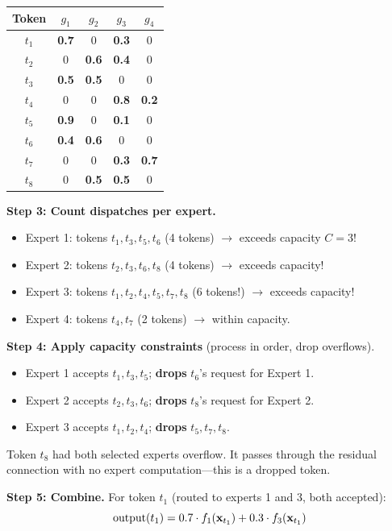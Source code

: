 \begin{center}
\begin{tabular}{c|cccc}
Token & $g_1$ & $g_2$ & $g_3$ & $g_4$ \\
\hline
$t_1$ & \textbf{0.7} & 0 & \textbf{0.3} & 0 \\
$t_2$ & 0 & \textbf{0.6} & \textbf{0.4} & 0 \\
$t_3$ & \textbf{0.5} & \textbf{0.5} & 0 & 0 \\
$t_4$ & 0 & 0 & \textbf{0.8} & \textbf{0.2} \\
$t_5$ & \textbf{0.9} & 0 & \textbf{0.1} & 0 \\
$t_6$ & \textbf{0.4} & \textbf{0.6} & 0 & 0 \\
$t_7$ & 0 & 0 & \textbf{0.3} & \textbf{0.7} \\
$t_8$ & 0 & \textbf{0.5} & \textbf{0.5} & 0 \\
\end{tabular}
\end{center}

\textbf{Step 3: Count dispatches per expert.}
\begin{itemize}
  \item Expert 1: tokens $t_1, t_3, t_5, t_6$ (4 tokens) $\to$ exceeds capacity $C=3$!
  \item Expert 2: tokens $t_2, t_3, t_6, t_8$ (4 tokens) $\to$ exceeds capacity!
  \item Expert 3: tokens $t_1, t_2, t_4, t_5, t_7, t_8$ (6 tokens!) $\to$ exceeds capacity!
  \item Expert 4: tokens $t_4, t_7$ (2 tokens) $\to$ within capacity.
\end{itemize}

\textbf{Step 4: Apply capacity constraints} (process in order, drop overflows).
\begin{itemize}
  \item Expert 1 accepts $t_1, t_3, t_5$; \textbf{drops} $t_6$'s request for Expert 1.
  \item Expert 2 accepts $t_2, t_3, t_6$; \textbf{drops} $t_8$'s request for Expert 2.
  \item Expert 3 accepts $t_1, t_2, t_4$; \textbf{drops} $t_5, t_7, t_8$.
\end{itemize}

Token $t_8$ had both selected experts overflow. It passes through the residual connection with no expert computation---this is a dropped token.

\textbf{Step 5: Combine.}
For token $t_1$ (routed to experts 1 and 3, both accepted):
\[
\text{output}(t_1) = 0.7 \cdot f_1(\mathbf{x}_{t_1}) + 0.3 \cdot f_3(\mathbf{x}_{t_1})
\]

